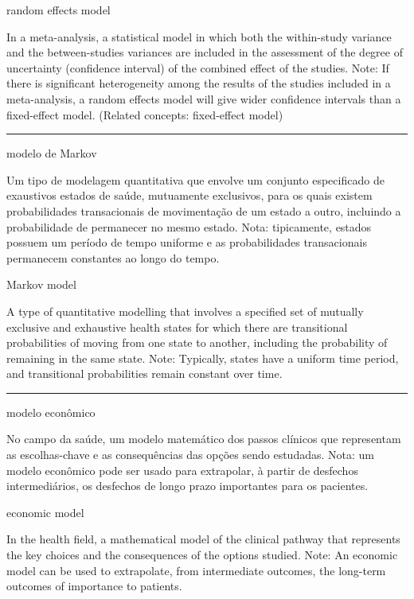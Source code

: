 \documentclass[
  openany]{book}
\begin{document}
random effects model

In a meta-analysis, a statistical model in which both the within-study variance and the between-studies variances are included in the assessment of the degree of uncertainty (confidence interval) of the combined effect of the studies. Note: If there is significant heterogeneity among the results of the studies included in a meta-analysis, a random effects model will give wider confidence intervals than a fixed-effect model. (Related concepts: fixed-effect model)

\begin{center}\rule{0.5\linewidth}{0.5pt}\end{center}

modelo de Markov

Um tipo de modelagem quantitativa que envolve um conjunto especificado de exaustivos estados de saúde, mutuamente exclusivos, para os quais existem probabilidades transacionais de movimentação de um estado a outro, incluindo a probabilidade de permanecer no mesmo estado. Nota: tipicamente, estados possuem um período de tempo uniforme e as probabilidades transacionais permanecem constantes ao longo do tempo.

Markov model

A type of quantitative modelling that involves a specified set of mutually exclusive and exhaustive health states for which there are transitional probabilities of moving from one state to another, including the probability of remaining in the same state. Note: Typically, states have a uniform time period, and transitional probabilities remain constant over time.

\begin{center}\rule{0.5\linewidth}{0.5pt}\end{center}

modelo econômico

No campo da saúde, um modelo matemático dos passos clínicos que representam as escolhas-chave e as consequências das opções sendo estudadas. Nota: um modelo econômico pode ser usado para extrapolar, à partir de desfechos intermediários, os desfechos de longo prazo importantes para os pacientes.

economic model

In the health field, a mathematical model of the clinical pathway that represents the key choices and the consequences of the options studied. Note: An economic model can be used to extrapolate, from intermediate outcomes, the long-term outcomes of importance to patients.
\end{document}
